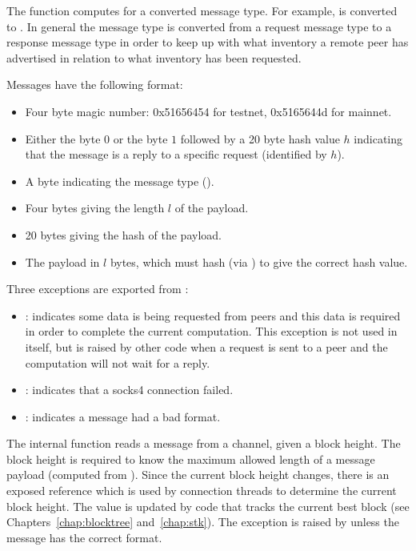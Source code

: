 The function {} computes {} for a converted
message type. For example, {} is converted to {}.
In general the message type is converted from a request message type to a response message type
in order to keep up with what inventory a remote peer has advertised
in relation to what inventory has been requested.

Messages have the following format:
\begin{itemize}
\item Four byte magic number: 0x51656454 for testnet, 0x5165644d for mainnet.
\item Either the byte $0$ or the byte $1$ followed by a 20 byte hash value $h$ indicating that the message is a reply to a specific request (identified by $h$).
\item A byte indicating the message type ().
\item Four bytes giving the length $l$ of the payload.
\item 20 bytes giving the hash of the payload.
\item The payload in $l$ bytes, which must hash (via {}) to give the correct hash value.
\end{itemize}

Three exceptions are exported from {}:
\begin{itemize}
\item {}: indicates some data is being requested from peers and this data is required
in order to complete the current computation. This exception is not used in {} itself, but is raised
by other code when a request is sent to a peer and the computation will not wait for a reply.
\item {}: indicates that a socks4 connection failed.
\item {}: indicates a message had a bad format.
\end{itemize}

The internal function {} reads a message from a channel, given a block height.
The block height is required to know the maximum allowed length of a message payload
(computed from {}).
Since the current block height changes, there is an exposed reference {}
which is used by connection threads to determine the current block height.
The value {} is updated by code that tracks the current best block (see Chapters~\ref{chap:blocktree} and~\ref{chap:stk}).
The exception {} is raised
by {} unless the message has the correct format.

